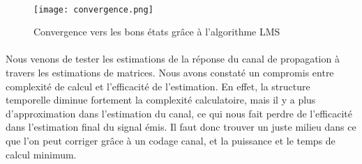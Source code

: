\paragraph{}
\vspace{1\baselineskip}
\begin{figure}[!h]
  \centering
  \texttt{[image: convergence.png]}
  \caption{Convergence vers les bons états grâce à l'algorithme LMS }
	\label{convergence}
\end{figure}
\paragraph{}
Nous venons de tester les estimations de la réponse du canal de propagation à
travers les estimations de matrices. Nous avons constaté un compromis entre
complexité de calcul et l'efficacité de l'estimation. En effet, la structure
temporelle diminue fortement la complexité calculatoire, mais il y a plus
d'approximation dans l'estimation du canal, ce qui nous fait perdre de
l'efficacité dans l'estimation final du signal émis. Il faut donc trouver un
juste milieu dans ce que l'on peut corriger grâce à un codage canal, et la
puissance et le temps de calcul minimum.

